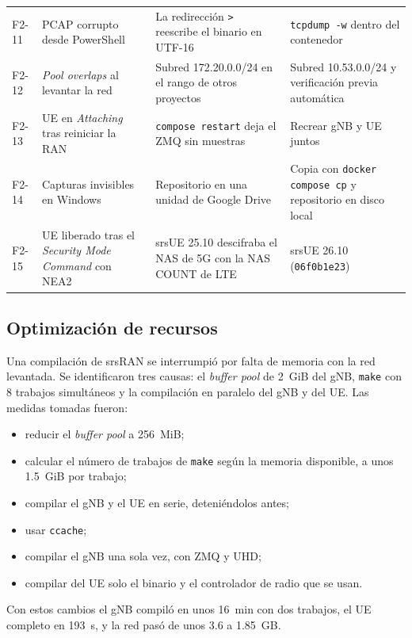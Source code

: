 \documentclass[conference]{IEEEtran}
\begin{document}
\begin{table}[!t]
\begin{tabular}{p{0.7cm}>{\raggedright\arraybackslash}p{5.0cm}>{\raggedright\arraybackslash}p{5.4cm}>{\raggedright\arraybackslash}p{5.4cm}}
F2-11 & PCAP corrupto desde PowerShell & La redirección \texttt{>} reescribe el binario en UTF-16 & \texttt{tcpdump -w} dentro del contenedor \\
F2-12 & \textit{Pool overlaps} al levantar la red & Subred 172.20.0.0/24 en el rango de otros proyectos & Subred 10.53.0.0/24 y verificación previa automática \\
F2-13 & UE en \textit{Attaching} tras reiniciar la RAN & \texttt{compose restart} deja el ZMQ sin muestras & Recrear gNB y UE juntos \\
F2-14 & Capturas invisibles en Windows & Repositorio en una unidad de Google Drive & Copia con \texttt{docker compose cp} y repositorio en disco local \\
F2-15 & UE liberado tras el \textit{Security Mode Command} con NEA2 & srsUE 25.10 descifraba el NAS de 5G con la NAS COUNT de LTE & srsUE 26.10 (\texttt{06f0b1e23}) \\
\bottomrule
\end{tabular}
\end{table}

\subsection{Optimización de recursos}
Una compilación de srsRAN se interrumpió por falta de memoria con la red levantada. Se identificaron tres causas: el \textit{buffer pool} de 2~GiB del gNB, \texttt{make} con 8 trabajos simultáneos y la compilación en paralelo del gNB y del UE. Las medidas tomadas fueron:
\begin{itemize}
  \item reducir el \textit{buffer pool} a 256~MiB;
  \item calcular el número de trabajos de \texttt{make} según la memoria disponible, a unos 1.5~GiB por trabajo;
  \item compilar el gNB y el UE en serie, deteniéndolos antes;
  \item usar \texttt{ccache};
  \item compilar el gNB una sola vez, con ZMQ y UHD;
  \item compilar del UE solo el binario y el controlador de radio que se usan.
\end{itemize}
Con estos cambios el gNB compiló en unos 16~min con dos trabajos, el UE completo en 193~s, y la red pasó de unos 3.6 a 1.85~GB.
\end{document}

